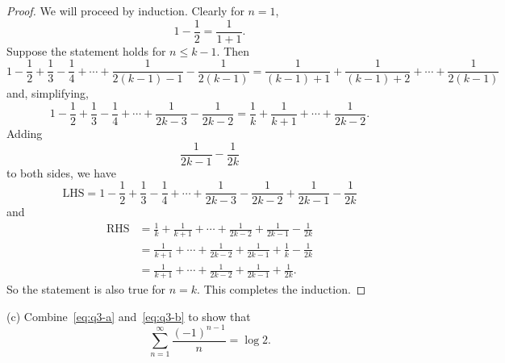 \documentclass{article}
\begin{document}
\begin{proof}

We will proceed by induction. Clearly for $n = 1$,
%
\begin{equation*}
    1 - \frac{1}{2} = \frac{1}{1 + 1}
    .
\end{equation*}
%
Suppose the statement holds for $n \leq k - 1$. Then
%
\begin{equation*}
    1 - \frac{1}{2} + \frac{1}{3} - \frac{1}{4} + \cdots + \frac{1}{2 (k - 1) - 1} - \frac{1}{2 (k - 1)}
    = \frac{1}{(k - 1) + 1} + \frac{1}{(k - 1) + 2} + \cdots + \frac{1}{2 (k - 1)}
\end{equation*}
%
and, simplifying,
%
\begin{equation*}
    1 - \frac{1}{2} + \frac{1}{3} - \frac{1}{4} + \cdots + \frac{1}{2 k - 3} - \frac{1}{2 k - 2}
    = \frac{1}{k} + \frac{1}{k + 1} + \cdots + \frac{1}{2 k - 2}
    .
\end{equation*}
%
Adding
%
\begin{equation*}
    \frac{1}{2 k - 1} - \frac{1}{2 k}
\end{equation*}
%
to both sides, we have
%
\begin{equation*}
    \text{LHS}
        = 1 - \frac{1}{2} + \frac{1}{3} - \frac{1}{4} + \cdots + \frac{1}{2 k - 3} - \frac{1}{2 k - 2}
            + \frac{1}{2 k - 1} - \frac{1}{2 k}
\end{equation*}
%
and
%
\begin{align*}
    \text{RHS}
        &= \frac{1}{k} + \frac{1}{k + 1} + \cdots + \frac{1}{2 k - 2} + \frac{1}{2 k - 1} - \frac{1}{2 k} \\
        &= \frac{1}{k + 1} + \cdots + \frac{1}{2 k - 2} + \frac{1}{2 k - 1} + \frac{1}{k} - \frac{1}{2 k} \\
        &= \frac{1}{k + 1} + \cdots + \frac{1}{2 k - 2} + \frac{1}{2 k - 1} + \frac{1}{2 k}
        .
\end{align*}
%
So the statement is also true for $n = k$. This completes the induction.

\end{proof}

(c) Combine~\eqref{eq:q3-a} and~\eqref{eq:q3-b} to show that
%
\begin{equation*}
   \sum_{n = 1}^\infty  \frac{(-1)^{n - 1}}{n} = \log 2.
\end{equation*}
\end{document}
